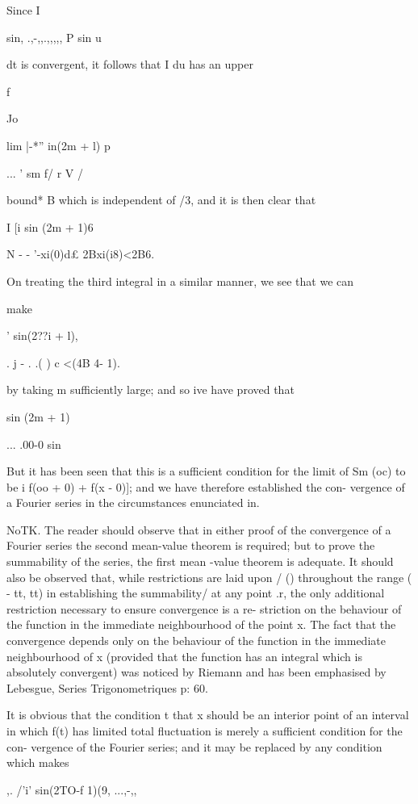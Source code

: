 Since I

sin, .,-,,.,,,,, P sin u

dt is convergent, it follows that I du has an upper

f

Jo

lim |-*'' in(2m + l) p

... ' sm f/ r V /

bound* B which is independent of /3, and it is then clear that

I [i sin (2m + 1)6

N - - '-xi(0)d£ 2Bxi(i8)<2B6.

On treating the third integral in a similar manner, we see that we can

make

  ' sin(2??i + l),

. j - . .( ) c <(4B 4- 1).

by taking m sufficiently large; and so ive have proved that

sin (2m + 1)

... .00-0 sin

But it has been seen that this is a sufficient condition for the limit
of Sm (oc) to be i f(oo + 0) + f(x - 0)]; and we have therefore
established the con- vergence of a Fourier series in the circumstances
enunciated in.

NoTK. The reader should observe that in either proof of the
convergence of a Fourier series the second mean-value theorem is
required; but to prove the summability of the series, the first mean
-value theorem is adequate. It should also be observed that, while
restrictions are laid upon / () throughout the range ( - tt, tt) in
establishing the summability/ at any point .r, the only additional
restriction necessary to ensure convergence is a re- striction on the
behaviour of the function in the immediate neighbourhood of the point
x. The fact that the convergence depends only on the behaviour of the
function in the immediate neighbourhood of x (provided that the
function has an integral which is absolutely convergent) was noticed
by Riemann and has been emphasised by Lebesgue, Series
Trigonometriques p: 60.

It is obvious that the condition t that x should be an interior point
of an interval in which f(t) has limited total fluctuation is merely a
sufficient condition for the con- vergence of the Fourier series; and
it may be replaced by any condition which makes

,. /'i' sin(2TO-f 1)(9, ...,-,,

